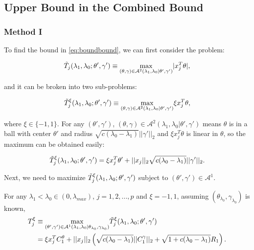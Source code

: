 \subsection{Upper Bound in the Combined Bound}

\subsubsection{Method I}

To find the bound in \eqref{eq:boundbound}, we can first consider the problem:

\begin{equation}
    \Tilde{T}_j(\lambda_1,\lambda_0;\theta',\gamma')\equiv\underset{(\theta,\gamma)\in\mathcal{A}^2(\lambda_1,\lambda_0|\theta',\gamma')}{\mathrm{max}}|x_j^T\theta|,
\end{equation}

and it can be broken into two sub-problems:

\begin{equation}
    \label{eq:ttilde}
    \Tilde{T}^\xi_j(\lambda_1,\lambda_0;\theta',\gamma')\equiv\underset{(\theta,\gamma)\in\mathcal{A}^2(\lambda_1,\lambda_0|\theta',\gamma')}{\mathrm{max}}\xi x_j^T\theta,
\end{equation}

where $\xi\in\{-1,1\}$. For any $(\theta',\gamma')$, $(\theta,\gamma)\in\mathcal{A}^2(\lambda_1,\lambda_0|\theta',\gamma')$ means $\theta$ is in a ball with center $\theta'$ and radius $\sqrt{c(\lambda_0-\lambda_1)}||\gamma'||_2$ and $\xi x_j^T\theta$ is linear in $\theta$, so the maximum can be obtained easily:

\begin{equation}
    \label{eq:ttildexi}
    \Tilde{T}^\xi_j(\lambda_1,\lambda_0;\theta',\gamma')=\xi x_j^T\theta'+||x_j||_2\sqrt{c(\lambda_0-\lambda_1)}||\gamma'||_2.
\end{equation}

Next, we need to maximize $\Tilde{T}^\xi_j(\lambda_1,\lambda_0;\theta',\gamma')$ subject to $(\theta',\gamma')\in\mathcal{A}^1$.

\begin{theorem}
    \label{thm:2.1}
    For any $\lambda_1<\lambda_{0}\in (0,\lambda_{max})$, $j=1,2,...,p$ and $\xi=-1,1$, assuming $(\theta_{\lambda_0},\gamma_{\lambda_0})$ is known,
    \begin{gather}
        \begin{aligned}
            T^\xi_j&\equiv\underset{(\theta',\gamma')\in\mathcal{A}^1(\lambda_1,\lambda_0|\theta_{\lambda_0},\gamma_{\lambda_0})}{\mathrm{max}}\Tilde{T}^\xi_j(\lambda_1,\lambda_0;\theta',\gamma')\\
            &=\xi x_j^TC_1^\theta+||x_j||_2\left(\sqrt{c(\lambda_0-\lambda_1)}||C_1^\gamma||_2+\sqrt{1+c(\lambda_0-\lambda_1)}R_1\right).
        \end{aligned}
    \end{gather}
\end{theorem}

